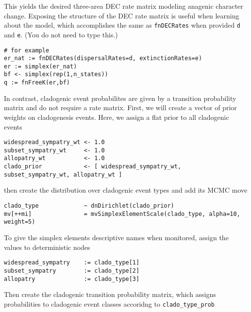 This yields the desired three-area DEC rate matrix modeling anagenic character change.
Exposing the structure of the DEC rate matrix is useful when learning about the model, which accomplishes the same as {\tt fnDECRates} when provided {\tt d} and {\tt e}. (You do not need to type this.)

\begin{snugshade}
\begin{lstlisting}
# for example
er_nat := fnDECRates(dispersalRates=d, extinctionRates=e)
er := simplex(er_nat)
bf <- simplex(rep(1,n_states))
q := fnFreeK(er,bf)
\end{lstlisting}
\end{snugshade}

In contrast, cladogenic event probabilites are given by a transition probability matrix and do not require a rate matrix.
First, we will create a vector of prior weights on cladogenesis events. Here, we assign a flat prior to all cladogenic events

\begin{snugshade}
\begin{lstlisting}
widespread_sympatry_wt <- 1.0
subset_sympatry_wt     <- 1.0
allopatry_wt           <- 1.0
clado_prior            <- [ widespread_sympatry_wt, subset_sympatry_wt, allopatry_wt ]
\end{lstlisting}
\end{snugshade}

then create the distribution over cladogenic event types and add its MCMC move

\begin{snugshade}
\begin{lstlisting}
clado_type             ~ dnDirichlet(clado_prior)
mv[++mi]               = mvSimplexElementScale(clado_type, alpha=10, weight=5)
\end{lstlisting}
\end{snugshade}

To give the simplex elements descriptive names when monitored, assign the values to deterministic nodes

\begin{snugshade}
\begin{lstlisting}
widespread_sympatry    := clado_type[1]
subset_sympatry        := clado_type[2]
allopatry              := clado_type[3]
\end{lstlisting}
\end{snugshade}

Then create the cladogenic transition probability matrix, which assigns probabilities to cladogenic event classes accoridng to {\tt clado\_type\_prob}

